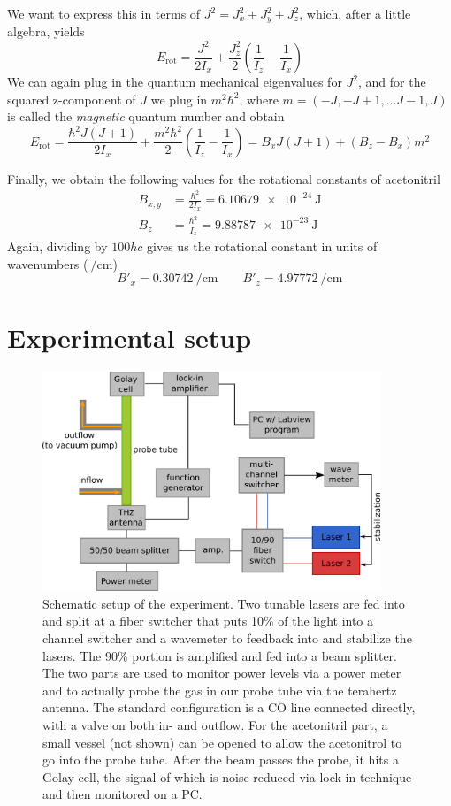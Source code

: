 \documentclass[a4paper,10pt]{scrartcl}
\begin{document}
We want to express this in terms of $J^2=J_x^2 + J_y^2 + J_z^2$, which, after a little algebra, yields
\begin{equation}
E_\mathrm{rot} = \frac{J^2}{2I_x} + \frac{J_z^2}{2} \left(\frac{1}{I_z} - \frac{1}{I_x}\right)
\end{equation}
We can again plug in the quantum mechanical eigenvalues for $J^2$, and for the squared z-component of $J$ we plug in $m^2 \hbar^2$, where $m=(-J, -J+1, \dots J-1, J)$ is called the \textit{magnetic} quantum number and obtain
\begin{equation}
E_\mathrm{rot} = \frac{\hbar^2 J(J+1)}{2I_x} + \frac{m^2\hbar^2}{2} \left(\frac{1}{I_z} - \frac{1}{I_x}\right) = B_x J(J+1) + (B_z - B_x)m^2
\end{equation}

Finally, we obtain the following values for the rotational constants of acetonitril
\begin{align*}
B_{x,y} &= \frac{\hbar^2}{2I_x}=\SI{6.10679e-24}{\joule} \\
B_z		&= \frac{\hbar^2}{I_z} =\SI{9.88787e-23}{\joule}
\end{align*}
Again, dividing by $100 hc$ gives us the rotational constant in units of wavenumbers ($\SI{}{\per\centi\meter}$)
\[
B'_x = \SI{0.30742}{\per\centi\meter} \qquad B'_z = \SI{4.97772}{\per\centi\meter}
\]
\section{Experimental setup}

\begin{figure}[H]
\centering
\includegraphics[width=0.9\textwidth]{img/setup}
\caption[caption]{Schematic setup of the experiment. Two tunable lasers are fed into and split at a fiber switcher that puts 10\% of the light into a channel switcher and a wavemeter to feedback into and stabilize the lasers. The 90\% portion is amplified and fed into a beam splitter. The two parts are used to monitor power levels via a power meter and to actually probe the gas in our probe tube via the terahertz antenna. The standard configuration is a CO line connected directly, with a valve on both in- and outflow. For the acetonitril part, a small vessel (not shown) can be opened to allow the acetonitrol to go into the probe tube. After the beam passes the probe, it hits a Golay cell, the signal of which is noise-reduced via lock-in technique and then monitored on a PC.}
\label{fig:setup}
\end{figure}
\end{document}
